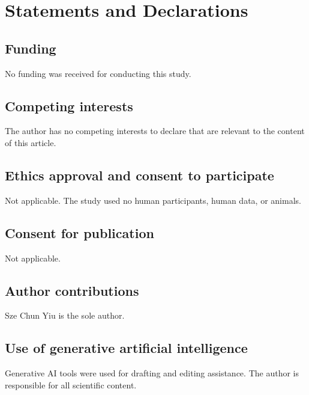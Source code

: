 \documentclass[pdflatex,sn-mathphys-num]{sn-jnl}
\begin{document}
\backmatter

\section*{Statements and Declarations}\label{statements-and-declarations}

\subsection{Funding}\label{funding}

No funding was received for conducting this study.

\subsection{Competing interests}\label{competing-interests}

The author has no competing interests to declare that are relevant to the content of this article.

\subsection{Ethics approval and consent to participate}\label{ethics-approval-and-consent-to-participate}

Not applicable. The study used no human participants, human data, or animals.

\subsection{Consent for publication}\label{consent-for-publication}

Not applicable.

\subsection{Author contributions}\label{author-contributions}

Sze Chun Yiu is the sole author.

\subsection{Use of generative artificial intelligence}\label{use-of-generative-artificial-intelligence}

Generative AI tools were used for drafting and editing assistance. The author is responsible for all scientific content.
\end{document}

